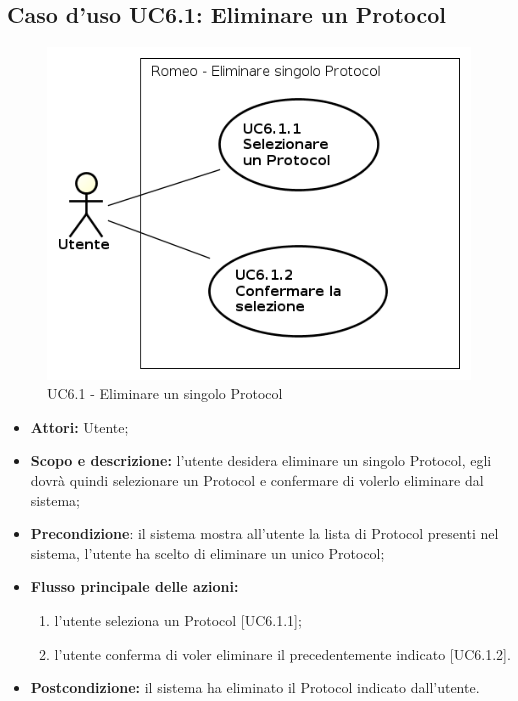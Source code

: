 \subsection{Caso d'uso UC6.1: Eliminare un Protocol}
\begin{figure}[!h]
\begin{center}
\includegraphics[scale=0.6]{./img/Use_Case/UC6_1}
\caption{UC6.1 - Eliminare un singolo Protocol}
\end{center}
\end{figure}
\begin{itemize}
\item \textbf{Attori:} Utente;
\item \textbf{Scopo e descrizione:} l'utente desidera eliminare un singolo Protocol\glossario{}, egli dovrà quindi selezionare un Protocol\glossario{} {} e confermare di volerlo eliminare dal sistema;
\item \textbf{Precondizione}: il sistema mostra all'utente la lista di Protocol\glossario{} presenti nel sistema, l'utente ha scelto di eliminare un unico Protocol\glossario{};
\item \textbf{Flusso principale delle azioni:}
\begin{enumerate}
\item l'utente seleziona un Protocol\glossario{} [UC6.1.1];
\item l'utente conferma di voler eliminare il \protocol{} precedentemente indicato [UC6.1.2].
\end{enumerate}
\item \textbf{Postcondizione:} il sistema ha eliminato il Protocol\glossario{} indicato dall'utente.
\end{itemize}

